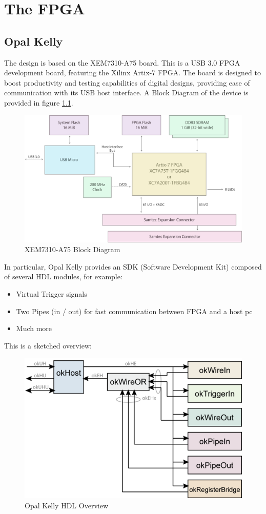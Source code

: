 \chapter{The FPGA}
\label{cha:fpga}

\section{Opal Kelly}
\label{sec:fpga-opal}
The design is based on the XEM7310-A75 board. This is a USB 3.0 FPGA development board, featuring the Xilinx Artix-7 FPGA. The board is designed to boost productivity and testing capabilities of digital designs, providing ease of communication with its USB host interface. A Block Diagram of the device is provided in figure \ref{fig:xem-block-diagram}.
\begin{figure}
    \centering
    \includegraphics[width=0.5\linewidth]{lt_bachelor_disi_en//images/2XEM7310-BlockDiagram.png}
    \caption{XEM7310-A75 Block Diagram}
    \label{fig:xem-block-diagram}
\end{figure}

In particular, Opal Kelly provides an SDK (Software Development Kit) composed of several HDL modules, for example:
\begin{itemize}
    \item Virtual Trigger signals
    \item Two Pipes (in / out) for fast communication between FPGA and a host pc
    \item Much more
\end{itemize}
This is a sketched overview:
\begin{figure}
    \centering
    \includegraphics[width=0.5\linewidth]{lt_bachelor_disi_en//images/FrontPanelHDL-USB3.png}
    \caption{Opal Kelly HDL Overview}
    \label{fig:opal-kelly-hdl}
\end{figure}


